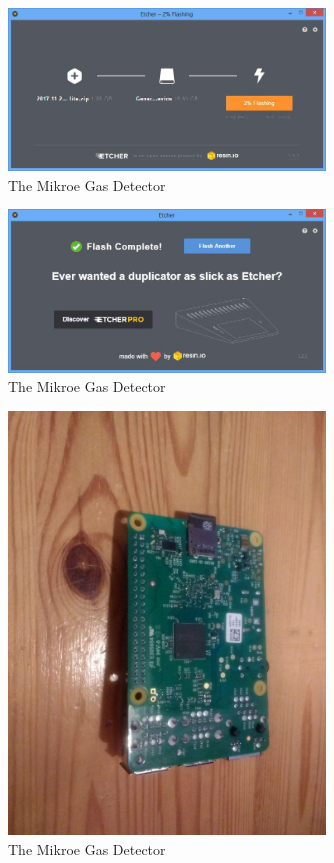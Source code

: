 \documentclass[11pt]{report}
\begin{document}
		\begin{figure}[ht]
			\centering
			\includegraphics[width=0.75\textwidth]{images/pi/install_etcher_5.jpg} 
			\caption{The Mikroe Gas Detector}
		\end{figure}

		\begin{figure}[ht]
			\centering
			\includegraphics[width=0.75\textwidth]{images/pi/install_etcher_6.jpg} 
			\caption{The Mikroe Gas Detector}
		\end{figure}

		\begin{figure}[ht]
			\centering
			\includegraphics[width=0.75\textwidth]{images/pi/install_sd_1.jpg} 
			\caption{The Mikroe Gas Detector}
		\end{figure}
\end{document}
